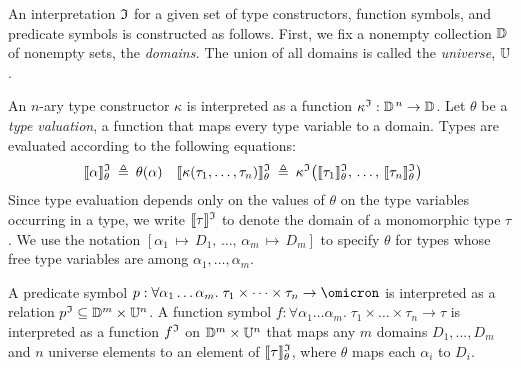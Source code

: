 An interpretation $\mathfrak{I}$ for a given set of type constructors,
function symbols, and predicate symbols is constructed as follows.
First, we fix a nonempty collection $\mathbb{D}$ of
nonempty sets, the {\em domains.} The union of all domains is called the
{\em universe}, %
$\mathbb{U}$.

An $n$-ary type constructor $\kappa$ is interpreted as a function
$\kappa^{\mathfrak{I}} : \mathbb{D}^{\,n} \to \mathbb{D}$.
Let $\theta$ be a {\em type valuation}, a function that maps every
type variable to a domain. Types are evaluated according to the following
equations:
\begin{align*}
\llbracket\alpha\rrbracket^{\mathfrak{I}}_{\theta} &\:\triangleq\: \theta(\alpha) &
\llbracket\kappa(\tau_1,\dots,\tau_n)\rrbracket^{\mathfrak{I}}_{\theta} &\:\triangleq\: \kappa^{\mathfrak{I}}\bigl(\llbracket\tau_1\rrbracket^{\mathfrak{I}}_{\theta},\,\dots,\,\llbracket\tau_n\rrbracket^{\mathfrak{I}}_{\theta}\bigr)
\end{align*}
Since type evaluation depends only on the values of $\theta$
on the type variables occurring in a type, we write $\llbracket\tau\rrbracket^{\mathfrak{I}}$
to denote the domain of a monomorphic type $\tau$.
We use the notation $[\alpha_1\,\mapsto\,D_1,\,\dots,\,\alpha_m\,\mapsto\,D_m]$
to specify $\theta$ for types whose free type variables are among
$\alpha_1,\dots,\alpha_m$.

A predicate symbol $p : \forall \alpha_1\dots\alpha_m .\; \tau_1 \times \dots \times \tau_n
\to \omicron$ is interpreted as a relation
$\smash{p^{\mathfrak{I}}} \subseteq \mathbb{D}^m \times \mathbb{U}^n$.
A function symbol $f : \forall \alpha_1\dots\alpha_m .\; \tau_1 \times \dots \times \tau_n \to \tau$
is interpreted as a function
$f^{\mathfrak{I}}$ on $\mathbb{D}^m \times \mathbb{U}^n$ that
maps any $m$ domains $D_1,\dots,D_m$ and
$n$ universe elements to an element of
$\llbracket\tau\rrbracket^{\mathfrak{I}}_\theta$, where $\theta$ maps each $\alpha_i$ to $D_i$.

